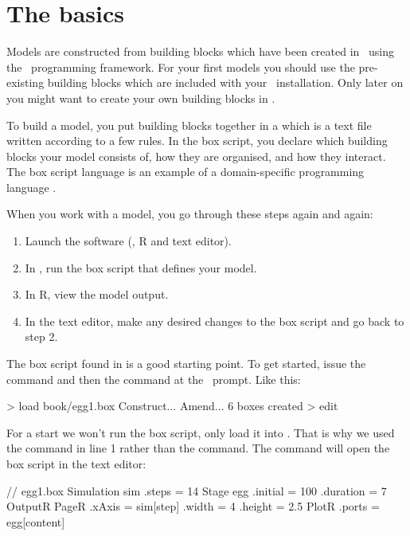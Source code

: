 \section{The basics}
Models are constructed from building blocks which have been created in \CPP\ using the \US\ programming framework. For your first models you should use the pre-existing building blocks which are included with your \US\ installation. Only later on you might want to create your own building blocks in \CPP.

To build a model, you put building blocks together in a  which is a text file written according to a few rules. In the box script, you declare which building blocks your model consists of, how they are organised, and how they interact. The box script language is an example of a domain-specific programming language \citep{HolstBelete}.

When you work with a model, you go through these steps again and again:

\begin{enumerate}
\item Launch the software (\US, R and text editor).
\item In \US, run the box script that defines your model.
\item In R, view the model output.
\item \label{NielsH} In the text editor, make any desired changes to the box script and go back to step 2.
\end{enumerate}

The box script found in  is a good starting point. To get started, issue the  command and then the  command at the \US\ prompt. Like this:

\lstset{numbers=left}
\begin{usdialog}
> load book/egg1.box
Construct...
Amend...
6 boxes created
> edit
\end{usdialog}
\lstset{numbers=none}

For a start we won't run the box script, only load it into \US. That is why we used the  command in line 1 rather than the  command. The  command will open the box script in the text editor:

\lstset{numbers=left}
\begin{boxscript}
// egg1.box
Simulation sim {
  .steps = 14
  Stage egg {
    .initial = 100 
    .duration = 7
  }
  OutputR {
    PageR {
      .xAxis = sim[step]
      .width = 4
      .height = 2.5
      PlotR {
        .ports = egg[content]
      }
    }
  }
}
\end{boxscript}
\lstset{numbers=none}

